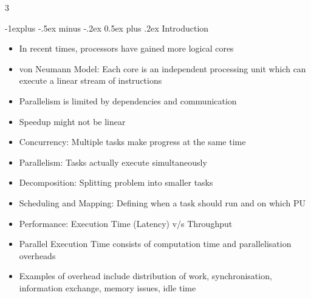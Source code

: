 \documentclass[10pt, landscape]{article}
\makeatletter
\renewcommand{\section}{\@startsection{section}{1}{0mm}%
                                {-1ex plus -.5ex minus -.2ex}%
                                {0.5ex plus .2ex}%
                                {\normalfont\large\bfseries}}
\renewcommand{\section}{\@startsection{section}{2}{0mm}%
                                {-1explus -.5ex minus -.2ex}%
                                {0.5ex plus .2ex}%
                                {\normalfont\normalsize\bfseries}}
\makeatother
\begin{document}
\raggedright
\footnotesize
\begin{multicols*}{3}

\setlength{\columnseprule}{0.25pt}
\setlength{\premulticols}{1pt}
\setlength{\postmulticols}{1pt}
\setlength{\multicolsep}{1pt}
\setlength{\columnsep}{2pt}

\begin{center}
\end{center}

\section{Introduction}
\begin{itemize}
    \item In recent times, processors have gained more logical cores
    \item von Neumann Model: Each core is an independent processing unit which can execute a linear stream of instructions
    \item Parallelism is limited by dependencies and communication
    \item Speedup might not be linear
    \item Concurrency: Multiple tasks make progress at the same time
    \item Parallelism: Tasks actually execute simultaneously
    \item Decomposition: Splitting problem into smaller tasks
    \item Scheduling and Mapping: Defining when a task should run and on which PU
    \item Performance: Execution Time (Latency) v/s Throughput
    \item Parallel Execution Time consists of computation time and parallelisation overheads
    \item Examples of overhead include distribution of work, synchronisation, information exchange, memory issues, idle time
\end{itemize}


\end{multicols*}
\end{document}
